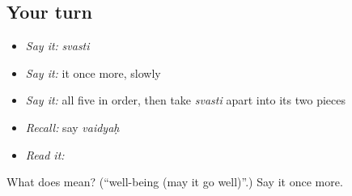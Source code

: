 \subsection*{Your turn}
\begin{itemize}
\raggedright
  \item \emph{Say it:} \emph{svasti}
  \item \emph{Say it:} it once more, slowly
  \item \emph{Say it:} all five in order, then take \emph{svasti} apart into its two pieces
  \item \emph{Recall:} say \emph{vaidyaḥ}
  \item \emph{Read it:} \textbf{}
\end{itemize}

\begin{tcolorbox}[breakable,colback=teal!4,colframe=teal!35!black,title={Before you move on}]
What does  mean? (\textquotedblleft{}well-being (may it go well)\textquotedblright{}.) Say it once more.
\end{tcolorbox}
